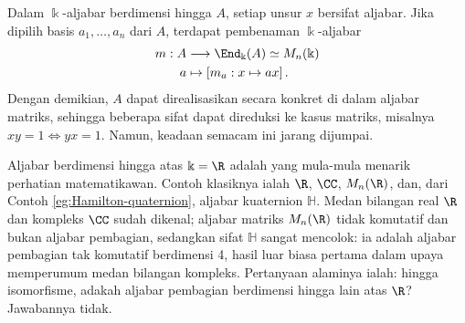 Dalam $\Bbbk$-aljabar berdimensi hingga $A$, setiap unsur $x$ bersifat aljabar. Jika dipilih basis $a_1, \ldots, a_n$ dari $A$, terdapat pembenaman $\Bbbk$-aljabar
\begin{equation*}\begin{aligned}
	m: A & \longrightarrow \End_\Bbbk(A) \simeq M_n(\Bbbk) \\
	a & \mapsto \left[m_a: x \mapsto ax \right].
\end{aligned}\end{equation*}
Dengan demikian, $A$ dapat direalisasikan secara konkret di dalam aljabar matriks, sehingga beberapa sifat dapat direduksi ke kasus matriks, misalnya $xy=1 \iff yx=1$. Namun, keadaan semacam ini jarang dijumpai.

Aljabar berdimensi hingga atas $\Bbbk=\R$ adalah yang mula-mula menarik perhatian matematikawan. Contoh klasiknya ialah $\R$, $\CC$, $M_n(\R)$, dan, dari Contoh \ref{eg:Hamilton-quaternion}, aljabar kuaternion $\mathbb{H}$. Medan bilangan real $\R$ dan kompleks $\CC$ sudah dikenal; aljabar matriks $M_n(\R)$ tidak komutatif dan bukan aljabar pembagian, sedangkan sifat $\mathbb{H}$ sangat mencolok: ia adalah aljabar pembagian tak komutatif berdimensi 4, hasil luar biasa pertama dalam upaya memperumum medan bilangan kompleks. Pertanyaan alaminya ialah: hingga isomorfisme, adakah aljabar pembagian berdimensi hingga lain atas $\R$? Jawabannya tidak.

